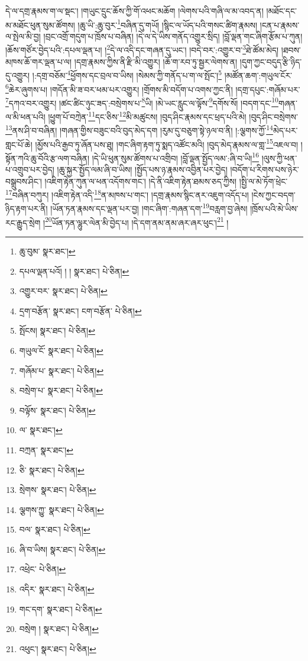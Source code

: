 དེ་ལ་དགྲ་རྣམས་ག་ལ་སྡང་། །གཡུང་དྲུང་ཆོས་ཀྱི་གོ་འཕང་མཆོག །ལེགས་པའི་གཞི་ལ་མ་འབད་ན། །མཐོང་དང་མ་མཐོང་ཕུན་སུམ་ཚོགས། །ཆུ་ཡི་:ཆུ་བུར་\footnote{ཆུ་བུམ་  སྣར་ཐང་། }བཞིན་དུ་གཡོ། །སྙིང་ལ་ཡོད་པའི་གསང་ཚིག་རྣམས། །ངན་པ་རྣམས་ལ་སྤེལ་མི་བྱ། །བྲང་འགྲོ་གདུག་པ་ཁྲོས་པ་བཞིན། །དེ་ལ་དེ་ཡིས་གནོད་འགྱུར་སྲིད། །བློ་ལྡན་གང་ཞིག་རྩོམ་པ་ཀུན། །ཆོས་གཙོར་བྱེད་པའི་:དཔལ་ལྡན་པ། །\footnote{དཔལ་ལྡན་པའོ། ། །  སྣར་ཐང་།  པེ་ཅིན། }དེ་ལ་འདི་དང་གཞན་དུ་ཡང་། །བདེ་བར་:འགྱུར་བ་\footnote{འགྱུར་བར་  སྣར་ཐང་།  པེ་ཅིན། }ཐེ་ཚོམ་མེད། །ཐབས་མཁས་ཆོ་གར་ལྡན་པ་ལ། །དགྲ་རྣམས་ཀྱིས་ནི་རྫི་མི་འགྱུར། །ཆོ་ག་རབ་ཏུ་སྦྱར་ལེགས་ན། །དུག་ཀྱང་བདུད་རྩི་ཉིད་དུ་འགྱུར། །:དགྲ་བཅོམ་\footnote{དྲག་བརྩོན་  སྣར་ཐང་། ངག་བརྩོན་  པེ་ཅིན། }ཕྱོགས་དང་བྲལ་བ་ཡིས། །སེམས་ཀྱི་གནོད་པ་ག་ལ་སྤོང་།\footnote{སྤོངས།  སྣར་ཐང་།  པེ་ཅིན། } །མཚོན་ཆག་:གཡུལ་ངོར་\footnote{གཡུལ་ངོ་  སྣར་ཐང་།  པེ་ཅིན། }ཆེར་ཞུགས་པ། །གདོན་མི་ཟ་བར་ཕམ་པར་འགྱུར། །གྲོགས་མི་བདོག་པ་འགས་ཀྱང་ནི། །དགྲ་དཔུང་:གཞོམ་པར་\footnote{གཞོམ་པ་  སྣར་ཐང་།  པེ་ཅིན། }དཀའ་བར་འགྱུར། །ཚང་ཚིང་ཉུང་ཟད་:བསྲེགས་པ་\footnote{བསྲེག་པ་  སྣར་ཐང་།  པེ་ཅིན། }ཡི། །མེ་ཡང་རླུང་ལ་ལྟོས་\footnote{བལྟོས་  སྣར་ཐང་།  པེ་ཅིན། }དགོས་སོ། །བདག་དང་\footnote{ལ་  སྣར་ཐང་། }གཞན་ལ་མི་ཕན་པའི། །ཕྱུག་པོ་བཀྲེན་\footnote{བཀྲན་  སྣར་ཐང་། }དང་ཅིས་\footnote{ཅི་  སྣར་ཐང་།  པེ་ཅིན། }མི་མཚུངས། །བུད་ཤིང་རྣམས་དང་ཕྲད་པའི་མེ། །བུད་ཤིང་བསྲེགས་\footnote{སྲེགས་  སྣར་ཐང་།  པེ་ཅིན། }ནས་ཤི་བ་བཞིན། །གཞན་གྱིས་བཟུང་བའི་བུད་མེད་དག །རུམ་དུ་བཅུག་སྟེ་ཉལ་བ་ནི། །:ལྕགས་ཀྱོ་\footnote{ལྕགས་ཀྱུ་  སྣར་ཐང་།  པེ་ཅིན། }མེད་པར་གླང་པོ་ཆེ། །མྱོས་པའི་རྒྱབ་ཏུ་ཞོན་པས་ཐུ། །གང་ཞིག་རྟག་ཏུ་སྨད་འཚོང་མའི། །བུད་མེད་རྣམས་ལ་གླ་\footnote{བལ་  སྣར་ཐང་།  པེ་ཅིན། }འཇལ་བ། །སྟོན་ཀའི་ཆུ་བོའི་རྩ་ལག་བཞིན། །དེ་ཡི་ཕུན་སུམ་ཚོགས་པ་འགྲིབ། །བློ་ལྡན་སྤྱོད་ལམ་:ཞི་བ་ཡི།\footnote{ཞི་བ་ཡིས།  སྣར་ཐང་།  པེ་ཅིན། } །ལུས་ཀྱི་ཕན་པ་འགྲུབ་པར་བྱེད། །ཆུ་སྐྱར་སྤྱོད་ལམ་ཞི་བ་ཡིས། །སྤྱོད་པས་ཉ་རྣམས་འབྱིན་པར་བྱེད། །བདོག་པ་རིགས་པས་ཉེར་བསྒྲུབས་ཤིང་། །འཇིག་རྟེན་ཀུན་ལ་ཕན་འདོགས་གང་། །དེ་ནི་འཇིག་རྟེན་ཐམས་ཅད་ཀྱིས། །སྤྱི་ལ་མེ་ཏོག་ཕྲེང་\footnote{འཕྲེང་  པེ་ཅིན། }བཞིན་བཀུར། །འཇིག་རྟེན་འདི་\footnote{འདིར་  སྣར་ཐང་།  པེ་ཅིན། }ན་མཁས་པ་གང་། །དགྲ་རྣམས་སྙིང་ནར་འཇུག་འདོད་པ། །ངེས་ཀྱང་བདག་ཉིད་རྟག་པར་ནི། །ཡོན་ཏན་རྣམས་དང་ལྡན་པར་བྱ། །གང་ཞིག་:གཞན་དག་\footnote{གང་དག་  སྣར་ཐང་།  པེ་ཅིན། }བརླག་བྱ་ཞེས། །ཁྲོས་པའི་མེ་ཡིས་རང་རྒྱུད་སྲེག །\footnote{བསྲེག །  སྣར་ཐང་།  པེ་ཅིན། }ཡོན་ཏན་ལྷུར་ལེན་མི་བྱེད་པ། །དེ་དག་ནམ་ནམ་ཞར་ཞར་ཕུང་།\footnote{འཕུང་།  སྣར་ཐང་།  པེ་ཅིན། } །
